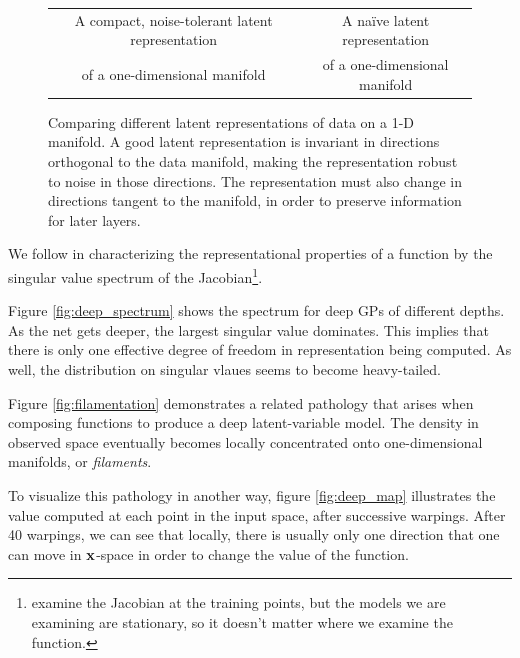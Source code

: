 \documentclass{article}
\begin{document}
\begin{figure}
\begin{tabular}{cc}
A compact, noise-tolerant latent representation & A na\"{i}ve latent representation \\
of a one-dimensional manifold & of a one-dimensional manifold
\end{tabular}
\caption{Comparing different latent representations of data on a 1-D manifold.  A good latent representation is invariant in directions orthogonal to the data manifold, making the representation robust to noise in those directions.  The representation must also change in directions tangent to the manifold, in order to preserve information for later layers. }%
\label{fig:hidden}
\end{figure}
%
%
We follow \cite{rifai2011contractive} in characterizing the representational properties of a function by the singular value spectrum of the Jacobian\footnote{ \cite{rifai2011contractive} examine the Jacobian at the training points, but the models we are examining are stationary, so it doesn't matter where we examine the function.}.  

Figure \ref{fig:deep_spectrum} shows the spectrum for deep GPs of different depths.  As the net gets deeper, the largest singular value dominates.  This implies that there is only one effective degree of freedom in representation being computed.  As well, the distribution on singular vlaues seems to become heavy-tailed.

Figure \ref{fig:filamentation} demonstrates a related pathology that arises when composing functions to produce a deep latent-variable model.  The density in observed space eventually becomes locally concentrated onto one-dimensional manifolds, or \emph{filaments}.

To visualize this pathology in another way, figure \ref{fig:deep_map} illustrates the value computed at each point in the input space, after successive warpings.  After 40 warpings, we can see that locally, there is usually only one direction that one can move in ${\bf{x}}$-space in order to change the value of the function.
\end{document}
